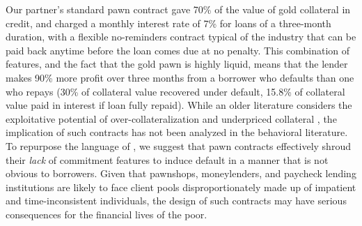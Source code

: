 \documentclass[oneside,11pt]{article}
\begin{document}
Our partner's standard pawn contract gave 70\% of the value of gold collateral in credit, and charged a monthly interest rate of 7\% for loans of a three-month duration, with a flexible no-reminders contract typical of the industry that can be paid back anytime before the loan comes due at no penalty. This combination of features, and the fact that the gold pawn is highly liquid, means that the lender makes 90\% more profit over three months from a borrower who defaults than one who repays (30\% of collateral value recovered under default, 15.8\% of collateral value paid in interest if loan fully repaid). While an older literature considers the exploitative potential of over-collateralization and underpriced collateral \citep{basu1984implicit}, the implication of such contracts has not been analyzed in the behavioral literature.  %
To repurpose the language of \cite{Laibson2018}, we suggest that pawn contracts effectively shroud their \textit{lack} of commitment features to induce default in a manner that is not obvious to borrowers. Given that pawnshops, moneylenders, and paycheck lending institutions are likely to face client pools disproportionately made up of impatient and time-inconsistent individuals, the design of such contracts may have serious consequences for the financial lives of the poor.


\end{document}
